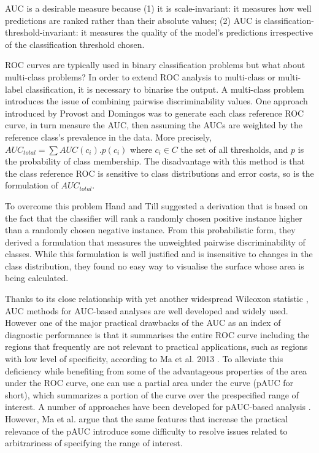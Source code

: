 \documentclass[a4paper,justified]{tufte-handout}
\begin{document}
\vspace{3mm}
\noindent AUC is a desirable measure because (1) it is scale-invariant: it measures how well predictions are ranked rather than their absolute values; (2) AUC is classification-threshold-invariant: it measures the quality of the model’s predictions irrespective of the classification threshold chosen.

\begin{fullwidth}

\vspace{3mm}
\noindent ROC curves are typically used in binary classification problems but what about multi-class problems? In order to extend ROC analysis to multi-class or multi-label classification, it is necessary to binarise the output. A multi-class problem introduces the issue of combining pairwise discriminability values. One approach introduced by Provost and Domingos \citep{provost2003treeind} was to generate each class reference ROC curve, in turn measure the AUC, then assuming the AUCs are weighted by the reference class’s prevalence in the data. More precisely, $AUC_{total} = \sum AUC(c_{i}).p(c_{i})$ where $c_{i}\in C$ the set of all thresholds, and $p$ is the probability of class membership.
The disadvantage with this method is that the class reference ROC is sensitive to class distributions and error costs, so is the formulation of $AUC_{total}$.

\vspace{3mm}
\noindent To overcome this problem Hand and Till \citep{hand2001aucmulticlass} suggested a derivation that is based on the fact that the classifier will rank a randomly chosen positive instance higher than a randomly chosen negative instance. From this probabilistic form, they derived a formulation that measures the unweighted pairwise discriminability of classes. While this formulation is well justified and is insensitive to changes in the class distribution, they found no easy way to visualise the surface whose area is being calculated.

\vspace{3mm}
\noindent Thanks to its close relationship with yet another widespread Wilcoxon statistic \citep{hanley1982useauc}, AUC methods for AUC-based analyses are well developed and widely used. However one of the major practical drawbacks of the AUC as an index of diagnostic performance is that it summarises the entire ROC curve including the regions that frequently are not relevant to practical applications, such as regions with low level of specificity, according to Ma et al. 2013 \citep{ma2013paucdiagperf}. To alleviate this deficiency while benefiting from some of the advantageous properties of the area under the ROC curve, one can use a partial area under the curve (pAUC for short), which summarizes a portion of the curve over the prespecified range of interest. A number of approaches have been developed for pAUC-based analysis \citep{dodd2003pauc,he2010nonparagenomic,mcclish1989paucanal,zhang2002nonparpaucapp}. However, Ma et al. argue that the same features that increase the practical relevance of the pAUC introduce some difficulty to resolve issues related to arbitrariness of specifying the range of interest. 


\end{fullwidth}
\end{document}
